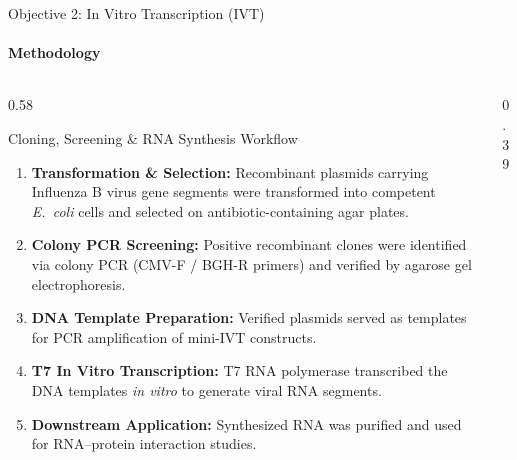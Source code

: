 \documentclass[aspectratio=169, 10pt]{beamer}
\begin{document}
\begin{frame}{Objective 2: In Vitro Transcription (IVT)}
  \framesubtitle{Methodology}
  \begin{columns}[c]
    \begin{column}{0.58\textwidth}
      \begin{block}{Cloning, Screening \& RNA Synthesis Workflow}
        \footnotesize
        \begin{enumerate}
          \setlength\itemsep{0.35em}
          \item \textbf{Transformation \& Selection:} Recombinant plasmids carrying Influenza B virus gene segments were transformed into competent \textit{E.\ coli} cells and selected on antibiotic-containing agar plates.
          \item \textbf{Colony PCR Screening:} Positive recombinant clones were identified via colony PCR (CMV-F / BGH-R primers) and verified by agarose gel electrophoresis.
          \item \textbf{DNA Template Preparation:} Verified plasmids served as templates for PCR amplification of mini-IVT constructs.
          \item \textbf{T7 In Vitro Transcription:} T7 RNA polymerase transcribed the DNA templates \textit{in vitro} to generate viral RNA segments.
          \item \textbf{Downstream Application:} Synthesized RNA was purified and used for RNA--protein interaction studies.
        \end{enumerate}
      \end{block}
    \end{column}

    \begin{column}{0.39\textwidth}
    \end{column}
  \end{columns}
\end{frame}
\end{document}
